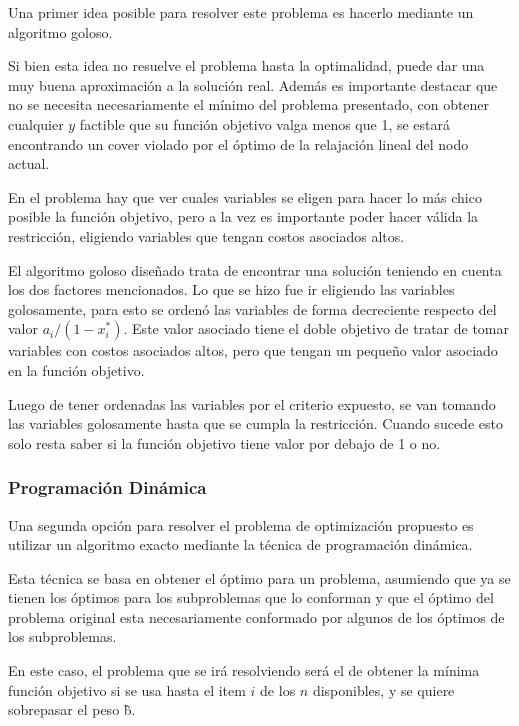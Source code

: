 Una primer idea posible para resolver este problema es hacerlo mediante un algoritmo goloso.

Si bien esta idea no resuelve el problema hasta la optimalidad, puede dar una muy buena aproximaci\'on a la soluci\'on real. Adem\'as es importante destacar que no se necesita necesariamente el m\'inimo del problema presentado, con obtener cualquier $y$ factible que su funci\'on objetivo valga menos que 1, se estar\'a encontrando un cover violado por el \'optimo de la relajaci\'on lineal del nodo actual.


En el problema hay que ver cuales variables se eligen para hacer lo m\'as chico posible la funci\'on objetivo, pero a la vez es importante poder hacer v\'alida la restricci\'on, eligiendo variables que tengan costos asociados altos.

El algoritmo goloso dise\~nado trata de encontrar una soluci\'on teniendo en cuenta los dos factores mencionados. Lo que se hizo fue ir eligiendo las variables golosamente, para esto se orden\'o las variables de forma decreciente respecto del valor $a_i / (1-x_i^*)$. Este valor asociado tiene el doble objetivo de tratar de tomar variables con costos asociados altos, pero que tengan un peque\~no valor asociado en la funci\'on objetivo.

Luego de tener ordenadas las variables por el criterio expuesto, se van tomando las variables golosamente hasta que se cumpla la restricci\'on. Cuando sucede esto solo resta saber si la funci\'on objetivo tiene valor por debajo de 1 o no.





\medskip
\subsubsection{Programaci\'on Din\'amica}

Una segunda opci\'on para resolver el problema de optimizaci\'on propuesto es utilizar un algoritmo exacto mediante la t\'ecnica de programaci\'on din\'amica.

Esta t\'ecnica se basa en obtener el \'optimo para un problema, asumiendo que ya se tienen los \'optimos para los subproblemas que lo conforman y que el \'optimo del problema original esta necesariamente conformado por algunos de los \'optimos de los subproblemas.


En este caso, el problema que se ir\'a resolviendo ser\'a el de obtener la m\'inima funci\'on objetivo si se usa hasta el item $i$ de los $n$ disponibles, y se quiere sobrepasar el peso \~b.

